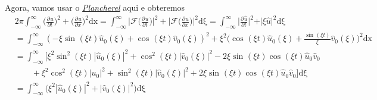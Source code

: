 \documentclass[../pde_notes.tex]{subfiles}
\begin{document}
Agora, vamos usar o \hyperlink{parseval_plancherel}{\textit{Plancherel}} aqui e obteremos
\begin{align*}
	 & 2\pi \int_{-\infty}^{\infty}\biggl(\frac{\partial^{}u}{\partial t^{}}\biggr)^{2} + \biggl(\frac{\partial^{}u}{\partial x^{}}\biggl)^{2} \mathrm{dx}  =\int_{-\infty}^{\infty}\biggl\vert \mathcal{F}\biggl(\frac{\partial^{}u}{\partial t^{}}\biggr) \biggr\vert^{2} + \biggl\vert \mathcal{F}\biggl(\frac{\partial^{}u}{\partial x^{}}\biggr) \biggr\vert^{2}\mathrm{d\xi } =\int_{-\infty}^{\infty}\biggl\vert \frac{\partial^{}\hat{u}}{\partial t^{}} \biggr\vert^{2}+\vert \xi \hat{u}\vert^{2} \mathrm{d\xi } \\
	 & = \int_{-\infty}^{\infty}(-\xi \sin^{}{(\xi t)}\hat{u}_{0}(\xi ) + \cos^{}{(\xi t)}\hat{v}_{0}(\xi ))^{2}+\xi^{2}\biggl(\cos^{}{(\xi t)}\hat{u}_{0}(\xi ) + \frac{\sin^{}{(\xi t)}}{\xi }\hat{v}_{0}(\xi )\biggr)^{2}\mathrm{dx}                                                                                                                                                                                                                                                                                    \\
	 & = \int_{-\infty}^{\infty}[\xi^{2}\sin^{2}{(\xi t)}|\hat{u}_{0}(\xi )|^{2}+\cos^{2}{(\xi t)}|\hat{v}_{0}(\xi )|^{2}-2\xi \sin^{}{(\xi t)}\cos^{}{(\xi t)}\hat{u}_{0}\hat{v}_{0}                                                                                                                                                                                                                                                                                                                                      \\
	 & \quad\quad  + \xi^{2}\cos^{2}{(\xi t)}|u_{0}|^{2} + \sin^{2}{(\xi t)}|\hat{v}_{0}(\xi )|^{2} + 2\xi \sin^{}{(\xi t)}\cos^{}{(\xi t)}\hat{u}_{0}\hat{v}_{0}] \mathrm{d\xi }                                                                                                                                                                                                                                                                                                                                          \\
	 & = \int_{-\infty}^{\infty}\biggl(\xi^{2}|\hat{u}_{0}(\xi )|^{2} + |\hat{v}_{0}(\xi )|^{2}\biggr) \mathrm{d\xi }                                                                                                                                                                                                                                                                                                                                                                                                      \\

\end{align*}
\end{document}
